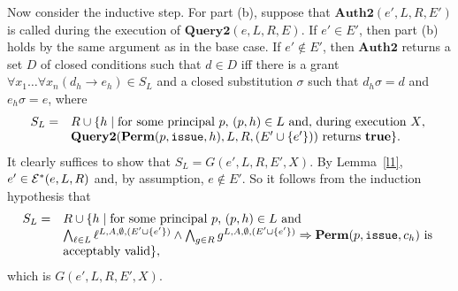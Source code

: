 \documentclass{acmtrans2m}
\newcommand{\rimp}{\Rightarrow}
\newcommand{\<}{
}
\renewcommand{\>}{\rangle}
\newcommand{\union}{\cup}
\newcommand{\true}{\mathit{\bf{true}}}
\newcommand{\Permitted}{\mathit{\bf Perm}}
\newcommand{\cd}{d}
\newcommand{\cc}{e}
\newcommand{\scc}{E}
\newcommand{\issue}{\mathtt{issue}}
\newcommand{\imp}{\rightarrow}
\newcommand{\XProcTwo}{\textbf{Query2}}
\newcommand{\XATwo}{\textbf{Auth2}}
\newcommand{\transwithE}[5]{#1^{#2, #3, #4, #5}}
\newcommand{\EStar}{{\cal E}^*}
\newcommand{\EX}{X}
\begin{document}
Now consider the inductive step.  For part (b), suppose that $\XATwo(\cc', L, R, \scc')$ is called
during the execution of $\XProcTwo(\cc, L, R, \scc)$.  If $\cc'\in\scc'$, then part (b) holds by
the same argument as in the base case.  If $\cc'\not\in\scc'$, then $\XATwo$ returns a set $D$ of
closed conditions such that $\cd\in D$ iff there is a grant
$\forall x_1 \ldots \forall x_n(\cd_h\imp\cc_h) \in S_L$ and a closed substitution $\sigma$ such
that $\cd_h\sigma = \cd$ and $\cc_h\sigma = \cc$, where
\[
\begin{array}{ll}
S_L =& R\union \{h\mid \mbox{for some principal $p$, } (p,h)\in L \mbox{ and, during execution $\EX$, }\\
&\XProcTwo(\Permitted(p, \issue, h), L, R, (\scc'\union\{\cc'\}))\mbox{ returns } \true\}.
\end{array}
\]
It clearly suffices to show that $S_L = G(\cc', L, R, \scc', \EX)$.  By Lemma~\ref{l1},
$\cc'\in\EStar(\cc, L, R)$ and, by assumption, $\cc\not\in\scc'$.  So it follows from the induction
hypothesis that
\[
\begin{array}{ll}
S_L = &R\union \{h\mid \mbox{for some principal $p$, } (p,h)\in L \mbox{ and }\\
&\bigwedge_{\ell\in L}\transwithE{\ell}{L}{A}{\emptyset}{(\scc'\union\{\cc'\})}\land
\bigwedge_{g\in R}\transwithE{g}{L}{A}{\emptyset}{(\scc'\union\{\cc'\})}\rimp
\Permitted(p, \issue, c_h)\mbox{ is }\\
&\mbox{acceptably valid}\},
\end{array}
\]
which is $G(\cc', L, R, \scc', \EX)$.
\end{document}
